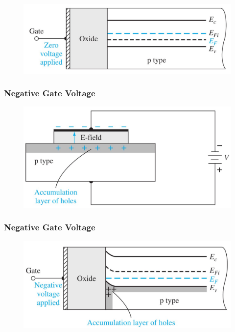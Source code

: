 \documentclass{beamer}
\begin{document}
\begin{frame}
\begin{minipage}{\linewidth}
\begin{minipage}{0.45\linewidth}
\begin{figure}[H]
                    \label{fig:MOS-graph-vertical.jpg}
                \end{figure}
            \end{minipage}
        \end{minipage}
        \begin{minipage}{\linewidth}
            \begin{figure}[H]
                \centering
                \includegraphics[width=0.6\linewidth]{PMOS-zero-gate-voltage-energy-band-diagram.jpg}
                \label{fig:PMOS-zero-gate-voltage-energy-band-diagram.jpg}
            \end{figure}
        \end{minipage}
    \end{frame}

    \begin{frame} \frametitle{Negative Gate Voltage}
        \begin{figure}[H]
            \centering
            \includegraphics[width=0.6\linewidth]{PMOS-negative-gate-voltage.jpg}
            \label{fig:PMOS-negative-gate-voltage.jpg}
        \end{figure}
    \end{frame}
    \begin{frame} \frametitle{Negative Gate Voltage}
        \begin{figure}[H]
            \centering
            \includegraphics[width=0.6\linewidth]{PMOS-negative-gate-voltage-energy-band-diagram.jpg}
            \label{fig:PMOS-negative-gate-voltage-energy-band-diagram.jpg}
        \end{figure}
    \end{frame}
\end{document}
